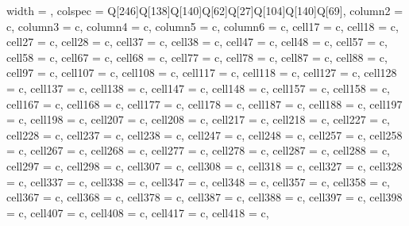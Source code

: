 \begin{longtblr}[
    caption = {\textbf{Summary of the inoculation tests on grapevine varieties
                ranked from most to less susceptible in the disease index.}
            Thirty-six local,
            regional and international varieties were screened in combination
            with eight
            rootstocks. The number of symptomatic leaves was counted 16 weeks
            after
            inoculation and infections were confirmed by qPCR. DI: disease
            index; AUDCP:
            area under the disease progress curve.},
    label = {tableS1},
    ]{
    width = \linewidth,
    colspec = {Q[246]Q[138]Q[140]Q[62]Q[27]Q[104]Q[140]Q[69]},
    column{2} = {c},
    column{3} = {c},
    column{4} = {c},
    column{5} = {c},
    column{6} = {c},
    cell{1}{7} = {c},
    cell{1}{8} = {c},
    cell{2}{7} = {c},
    cell{2}{8} = {c},
    cell{3}{7} = {c},
    cell{3}{8} = {c},
    cell{4}{7} = {c},
    cell{4}{8} = {c},
    cell{5}{7} = {c},
    cell{5}{8} = {c},
    cell{6}{7} = {c},
    cell{6}{8} = {c},
    cell{7}{7} = {c},
    cell{7}{8} = {c},
    cell{8}{7} = {c},
    cell{8}{8} = {c},
    cell{9}{7} = {c},
    cell{10}{7} = {c},
    cell{10}{8} = {c},
    cell{11}{7} = {c},
    cell{11}{8} = {c},
    cell{12}{7} = {c},
    cell{12}{8} = {c},
    cell{13}{7} = {c},
    cell{13}{8} = {c},
    cell{14}{7} = {c},
    cell{14}{8} = {c},
    cell{15}{7} = {c},
    cell{15}{8} = {c},
    cell{16}{7} = {c},
    cell{16}{8} = {c},
    cell{17}{7} = {c},
    cell{17}{8} = {c},
    cell{18}{7} = {c},
    cell{18}{8} = {c},
    cell{19}{7} = {c},
    cell{19}{8} = {c},
    cell{20}{7} = {c},
    cell{20}{8} = {c},
    cell{21}{7} = {c},
    cell{21}{8} = {c},
    cell{22}{7} = {c},
    cell{22}{8} = {c},
    cell{23}{7} = {c},
    cell{23}{8} = {c},
    cell{24}{7} = {c},
    cell{24}{8} = {c},
    cell{25}{7} = {c},
    cell{25}{8} = {c},
    cell{26}{7} = {c},
    cell{26}{8} = {c},
    cell{27}{7} = {c},
    cell{27}{8} = {c},
    cell{28}{7} = {c},
    cell{28}{8} = {c},
    cell{29}{7} = {c},
    cell{29}{8} = {c},
    cell{30}{7} = {c},
    cell{30}{8} = {c},
    cell{31}{8} = {c},
    cell{32}{7} = {c},
    cell{32}{8} = {c},
    cell{33}{7} = {c},
    cell{33}{8} = {c},
    cell{34}{7} = {c},
    cell{34}{8} = {c},
    cell{35}{7} = {c},
    cell{35}{8} = {c},
    cell{36}{7} = {c},
    cell{36}{8} = {c},
    cell{37}{8} = {c},
    cell{38}{7} = {c},
    cell{38}{8} = {c},
    cell{39}{7} = {c},
    cell{39}{8} = {c},
    cell{40}{7} = {c},
    cell{40}{8} = {c},
    cell{41}{7} = {c},
    cell{41}{8} = {c},
}
\end{longtblr}
